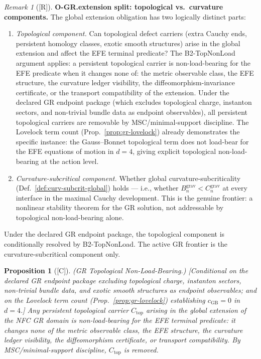 \documentclass[12pt,oneside]{amsbook}
\theoremstyle{plain}
\newtheorem{proposition}[theorem]{Proposition}
\theoremstyle{definition}
\theoremstyle{remark}
\newtheorem{remark}[theorem]{Remark}
\newcommand{\status}[1]{\textup{[#1]}}
\begin{document}
\begin{remark}[\status{R}]\label{rem:gr-extension-split}
\textbf{O-GR.extension split: topological vs.\ curvature components.}
The global extension obligation has two logically distinct parts:
\begin{enumerate}[label=\textup{(\arabic*)}]
 \item \emph{Topological component.} Can topological defect
 carriers (extra Cauchy ends, persistent homology classes, exotic
 smooth structures) arise in the global extension and affect the
 EFE terminal predicate? The B2-TopNonLoad argument applies:
 a persistent topological carrier is non-load-bearing for the EFE
 predicate when it changes none of: the metric observable class,
 the EFE structure, the curvature ledger visibility, the
 diffeomorphism-invariance certificate, or the transport
 compatibility of the extension. Under the declared GR endpoint
 package (which excludes topological charge, instanton sectors,
 and non-trivial bundle data as endpoint observables), all
 persistent topological carriers are removable by MSC/minimal-support
 discipline. The Lovelock term count (Prop.~\ref{prop:gr-lovelock})
 already demonstrates the specific instance: the Gauss--Bonnet
 topological term does not load-bear for the EFE equations of
 motion in $d=4$, giving explicit topological non-load-bearing
 at the action level.
 \item \emph{Curvature-subcritical component.} Whether global
 curvature-subcriticality (Def.~\ref{def:curv-subcrit-global})
 holds --- i.e., whether $B_n^{\mathrm{grav}} < C_n^{\mathrm{grav}}$
 at every interface in the maximal Cauchy development. This is the
 genuine frontier: a nonlinear stability theorem for the GR solution,
 not addressable by topological non-load-bearing alone.
\end{enumerate}
Under the declared GR endpoint package, the topological component is
conditionally resolved by B2-TopNonLoad. The active GR frontier is
the curvature-subcritical component only.
\end{remark}

\begin{proposition}[\status{C}]\label{prop:gr-topo-nonload}
\textup{(GR Topological Non-Load-Bearing.)}
\textup{[Conditional on the declared GR endpoint package excluding
topological charge, instanton sectors, non-trivial bundle data, and
exotic smooth structures as endpoint observables; and on the Lovelock
term count (Prop.~\ref{prop:gr-lovelock}) establishing $c_{\mathrm{GB}}=0$
in $d=4$.]}
Any persistent topological carrier $C_{\mathrm{top}}$ arising in
the global extension of the NFC GR domain is non-load-bearing for
the EFE terminal predicate: it changes none of the metric observable
class, the EFE structure, the curvature ledger visibility, the
diffeomorphism certificate, or transport compatibility.
By MSC/minimal-support discipline, $C_{\mathrm{top}}$ is removed.
\end{proposition}
\end{document}

